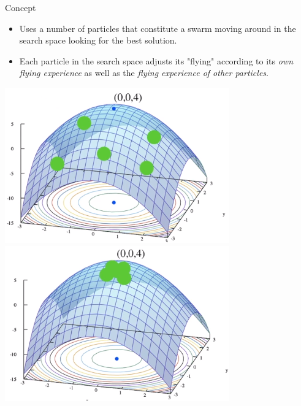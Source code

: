 \documentclass[pdflatex,compress,mathserif]{beamer}
\begin{document}
\begin{frame}{Concept}
	\begin{itemize}
		\item Uses a number of particles that constitute a swarm moving around in the search space looking for the best solution.
		\item Each particle in the search space adjusts its "flying" according to its \emph{own flying experience} as well as the \emph{flying experience of other particles}.
	\end{itemize}
	\begin{multicols}{2}
		\includegraphics[width=\linewidth]{img/07}
		\columnbreak
		\includegraphics[width=\linewidth]{img/08}
	\end{multicols}
\end{frame}
\end{document}
